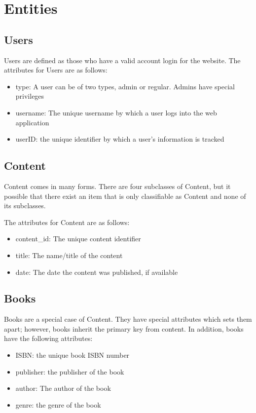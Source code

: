 \documentclass[letter, 12pt, titlepage]{article}
\begin{document}
	\section{Entities}
		\subsection{Users}
			Users are defined as those who have a valid account login for the website.
			The attributes for Users are as follows:
			\begin{itemize}
				\item type: A user can be of two types, admin or regular. Admins have special privileges
				\item username: The unique username by which a user logs into the web application
				\item userID: the unique identifier by which a user's information is tracked
			\end{itemize}
		\subsection{Content}
				Content comes in many forms. There are four subclasses of Content, but it possible that there exist an item that is only classifiable as Content and none of its subclasses. 
			
				The attributes for Content are as follows:
			\begin{itemize}
				\item content\_id: The unique content identifier
				\item title: The name/title of the content
				\item date: The date the content was published, if available
			\end{itemize}
			\subsection{Books}
				Books are a special case of Content. They have special attributes which sets them apart; however, books inherit the primary key from content. In addition, books have the following attributes:
			\begin{itemize}
				\item ISBN: the unique book ISBN number
				\item publisher: the publisher of the book
				\item author: The author of the book
				\item genre: the genre of the book
			\end{itemize}
\end{document}
